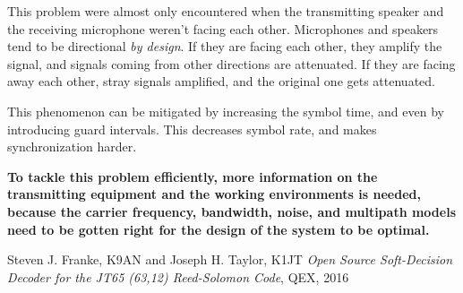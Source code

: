 \documentclass[a4paper]{article}
\begin{document}
This problem were almost only encountered when the transmitting speaker
and the receiving microphone weren't facing each other. Microphones and
speakers tend to be directional \emph{by design}. If they are facing
each other, they amplify the signal, and signals coming from other
directions are attenuated. If they are facing away each other, stray
signals amplified, and the original one gets attenuated.

This phenomenon can be mitigated by increasing the symbol time, and
even by introducing guard intervals. This decreases symbol rate, and
makes synchronization harder.

\textbf{To tackle this problem efficiently, more information on the
transmitting equipment and the working environments is needed, because
the carrier frequency, bandwidth, noise, and multipath models need to be
gotten right for the design of the system to be optimal.}

\begin{thebibliography}{9}
  Steven J. Franke, K9AN and Joseph H. Taylor, K1JT
  \emph{Open Source Soft-Decision Decoder for the JT65 (63,12) Reed-Solomon
  Code}, QEX, 2016
\end{thebibliography}
\end{document}
